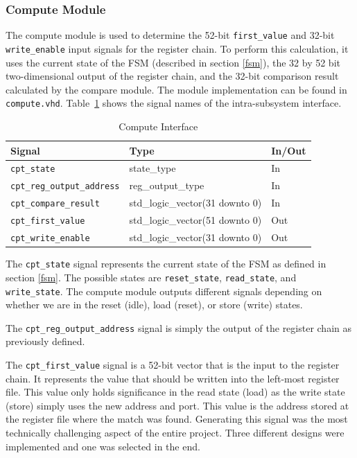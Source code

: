 \documentclass{article}
\begin{document}
\newpage
\subsubsection{Compute Module}

The compute module is used to determine the 52-bit \texttt{first\_value} and 32-bit \texttt{write\_enable} input signals for the register chain. To perform this calculation, it uses the current state of the FSM (described in section \ref{fsm}), the 32 by 52 bit two-dimensional output of the register chain, and the 32-bit comparison result calculated by the compare module. The module implementation can be found in \texttt{compute.vhd}. Table~\ref{tab:compute} shows the signal names of the intra-subsystem interface. 

\begin{table}[ht]
    \begin{center}
        \begin{tabular}{lll}\hline
        Signal & Type & In/Out \\
        \hline
        \texttt{cpt\_state} & state\_type & In \\
        \hline
        \texttt{cpt\_reg\_output\_address} & reg\_output\_type & In \\
        \hline
        \texttt{cpt\_compare\_result} & std\_logic\_vector(31 downto 0) & In \\
        \hline
        \texttt{cpt\_first\_value} & std\_logic\_vector(51 downto 0) & Out \\
        \hline
        \texttt{cpt\_write\_enable} & std\_logic\_vector(31 downto 0) & Out \\
        \hline
        \end{tabular}
        \caption{Compute Interface}\label{tab:compute}
    \end{center}
\end{table}

The \texttt{cpt\_state} signal represents the current state of the FSM as defined in section \ref{fsm}. The possible states are \texttt{reset\_state}, \texttt{read\_state}, and \texttt{write\_state}. The compute module outputs different signals depending on whether we are in the reset (idle), load (reset), or store (write) states.

The \texttt{cpt\_reg\_output\_address} signal is simply the output of the register chain as previously defined.

The \texttt{cpt\_first\_value} signal is a 52-bit vector that is the input to the register chain. It represents the value that should be written into the left-most register file. This value only holds significance in the read state (load) as the write state (store) simply uses the new address and port. This value is the address stored at the register file where the match was found. Generating this signal was the most technically challenging aspect of the entire project. Three different designs were implemented and one was selected in the end.
\end{document}
